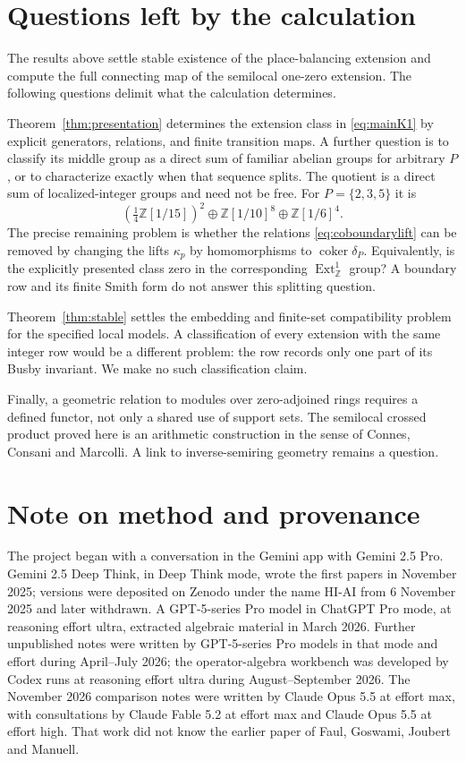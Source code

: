 \documentclass[11pt]{article}
\newcommand{\Z}{\mathbb Z}
\newcommand{\coker}{\operatorname{coker}}
\theoremstyle{definition}
\theoremstyle{remark}
\begin{document}
\section{Questions left by the calculation}

The results above settle stable existence of the place-balancing extension and compute the full connecting map of the semilocal one-zero extension. The following questions delimit what the calculation determines.

Theorem~\ref{thm:presentation} determines the extension class in \eqref{eq:mainK1} by explicit generators, relations, and finite transition maps. A further question is to classify its middle group as a direct sum of familiar abelian groups for arbitrary $P$, or to characterize exactly when that sequence splits. The quotient is a direct sum of localized-integer groups and need not be free. For $P=\{2,3,5\}$ it is
\[
 (\tfrac14\Z[1/15])^2\oplus\Z[1/10]^8\oplus\Z[1/6]^4.
\]
The precise remaining problem is whether the relations \eqref{eq:coboundarylift} can be removed by changing the lifts $\kappa_p$ by homomorphisms to $\coker\delta_P$. Equivalently, is the explicitly presented class zero in the corresponding $\operatorname{Ext}^1_{\Z}$ group? A boundary row and its finite Smith form do not answer this splitting question.

Theorem~\ref{thm:stable} settles the embedding and finite-set compatibility problem for the specified local models. A classification of every extension with the same integer row would be a different problem: the row records only one part of its Busby invariant. We make no such classification claim.

Finally, a geometric relation to modules over zero-adjoined rings requires a defined functor, not only a shared use of support sets. The semilocal crossed product proved here is an arithmetic construction in the sense of Connes, Consani and Marcolli. A link to inverse-semiring geometry remains a question.

\section*{Note on method and provenance}

The project began with a conversation in the Gemini app with Gemini 2.5 Pro. Gemini 2.5 Deep Think, in Deep Think mode, wrote the first papers in November 2025; versions were deposited on Zenodo under the name HI-AI from 6 November 2025 and later withdrawn. A GPT-5-series Pro model in ChatGPT Pro mode, at reasoning effort ultra, extracted algebraic material in March 2026. Further unpublished notes were written by GPT-5-series Pro models in that mode and effort during April--July 2026; the operator-algebra workbench was developed by Codex runs at reasoning effort ultra during August--September 2026. The November 2026 comparison notes were written by Claude Opus 5.5 at effort max, with consultations by Claude Fable 5.2 at effort max and Claude Opus 5.5 at effort high. That work did not know the earlier paper of Faul, Goswami, Joubert and Manuell.
\end{document}
